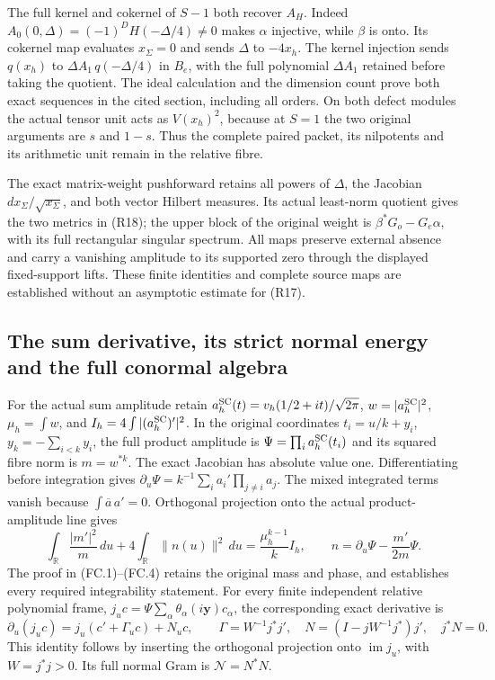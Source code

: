 The full kernel and cokernel of \(S-1\) both recover \(A_H\).
Indeed \(A_0(0,\Delta)=(-1)^DH(-\Delta/4)\ne0\) makes
\(\alpha\) injective, while \(\beta\) is onto. Its cokernel
map evaluates \(x_\Sigma=0\) and sends \(\Delta\) to
\(-4x_h\). The kernel injection sends
\(q(x_h)\) to \(\Delta A_1\,q(-\Delta/4)\) in \(B_e\),
with the full polynomial \(\Delta A_1\) retained before taking
the quotient. The ideal calculation and the dimension count prove
both exact sequences in the cited section, including all orders.
On both defect modules the actual tensor unit acts as
\(V(x_h)^2\), because at \(S=1\) the two original arguments
are \(s\) and \(1-s\). Thus the complete paired packet, its
nilpotents and its arithmetic unit remain in the relative fibre.

The exact matrix-weight pushforward retains all powers of
\(\Delta\), the Jacobian \(dx_\Sigma/\sqrt{x_\Sigma}\),
and both vector Hilbert measures. Its actual least-norm quotient
gives the two metrics in (R18); the upper block of the original
weight is \(\beta^*G_o-G_e\alpha\), with its full rectangular
singular spectrum. All maps preserve external absence and carry a
vanishing amplitude to its supported zero through the displayed
fixed-support lifts. These finite identities and complete source
maps are established without an asymptotic estimate for (R17).

\subsection{The sum derivative, its strict normal energy and the full conormal algebra}

For the actual sum amplitude retain
\(a_h^{\rm SC}(t)=v_h(1/2+it)/\sqrt{2\pi}\),
\(w=|a_h^{\rm SC}|^2\), \(\mu_h=\int w\), and
\(I_h=4\int|(a_h^{\rm SC})'|^2\).
In the original coordinates \(t_i=u/k+y_i\),
\(y_k=-\sum_{i<k}y_i\), the full product amplitude is
\(\Psi=\prod_i a_h^{\rm SC}(t_i)\) and its squared fibre norm
is \(m=w^{*k}\). The exact Jacobian has absolute value one.
Differentiating before integration gives
\(\partial_u\Psi=k^{-1}\sum_i a_i'\prod_{j\ne i}a_j\).
The mixed integrated terms vanish because
\(\int\overline a\,a'=0\). Orthogonal projection onto the
actual product-amplitude line gives
\[
 \int_{\mathbb R}\frac{|m'|^2}{m}\,du
       +4\int_{\mathbb R}\|n(u)\|^2\,du
          =\frac{\mu_h^{k-1}}k I_h,\qquad
 n=\partial_u\Psi-\frac{m'}{2m}\Psi .
 \tag{R19}
\]
The proof in (FC.1)--(FC.4) retains the original mass and
phase, and establishes every required integrability statement.
For every finite independent relative polynomial frame,
\(j_uc=\Psi\sum_\alpha\theta_\alpha(i\mathbf y)c_\alpha\),
the corresponding exact derivative is
\[
 \partial_u(j_uc)=j_u(c'+\Gamma_uc)+N_uc,\qquad
 \Gamma=W^{-1}j^*j',\quad
 N=(I-jW^{-1}j^*)j',\quad j^*N=0 .
 \tag{R20}
\]
This identity follows by inserting the orthogonal projection onto
\(\operatorname{im}j_u\), with \(W=j^*j>0\). Its full normal
Gram is \(\mathcal N=N^*N\).

